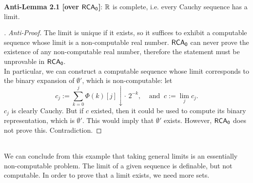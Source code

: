 \documentclass{amsart}
\begin{document}
	\noindent \textbf{Anti-Lemma 2.1 [over $\operatorname{\sf{RCA_0}}$]}: $\mathbb{R}$ is complete, i.e. every Cauchy sequence has a limit.
	\begin{proof}[\unskip\nopunct]
		\textit{Anti-Proof.} The limit is unique if it exists, so it suffices to exhibit a computable sequence whose limit is a non-computable real number. $\operatorname{\sf{RCA_0}}$ can never prove the existence of any non-computable real number, therefore the statement must be unprovable in $\operatorname{\sf{RCA_0}}$.\\
		
		In particular, we can construct a computable sequence whose limit corresponds to the binary expansion of $\emptyset'$, which is non-computable: let
		$$
		c_j := \sum_{k=0}^j \Phi(k)[j]\downarrow \cdot \,\, 2^{-k}, \;\;\;\; \text{and} \;\; c := \lim_j c_j.
		$$
		$c_j$ is clearly Cauchy. But if $c$ existed, then it could be used to compute its binary representation, which is $\emptyset'$. This would imply that $\emptyset'$ exists. However, $\operatorname{\sf{RCA_0}}$ does not prove this. Contradiction. 
	\end{proof}\\
	
	We can conclude from this example that taking general limits is an essentially non-computable problem. The limit of a given sequence is definable, but not computable. In order to prove that a limit exists, we need more sets.
	
	
	
\end{document}
